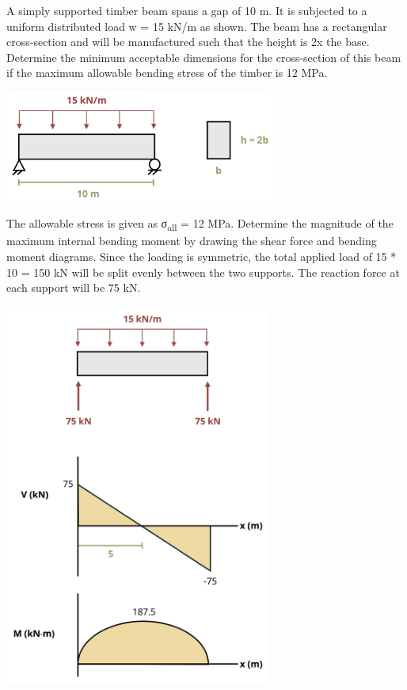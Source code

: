\documentclass[
  letterpaper,
  DIV=11,
  numbers=noendperiod]{scrreprt}
\begin{document}
\begin{tcolorbox}[enhanced jigsaw, colbacktitle=quarto-callout-note-color!10!white, title={Example 9.4: Design of rectangular cross-section}, coltitle=black, leftrule=.75mm, rightrule=.15mm, opacityback=0, breakable, colframe=quarto-callout-note-color-frame, left=2mm, arc=.35mm, colback=white, bottomrule=.15mm, bottomtitle=1mm, toptitle=1mm, titlerule=0mm, opacitybacktitle=0.6, toprule=.15mm]

A simply supported timber beam spans a gap of 10 m. It is subjected to a
uniform distributed load w = 15 kN/m as shown. The beam has a
rectangular cross-section and will be manufactured such that the height
is 2x the base. Determine the minimum acceptable dimensions for the
cross-section of this beam if the maximum allowable bending stress of
the timber is 12 MPa.

\begin{center}
\includegraphics[width=3.48958in,height=\textheight]{images/CH9 PNGs/Example 9.4 part 1.png}
\end{center}

The allowable stress is given as σ\textsubscript{all} = 12 MPa.
Determine the magnitude of the maximum internal bending moment by
drawing the shear force and bending moment diagrams. Since the loading
is symmetric, the total applied load of 15 * 10 = 150 kN will be split
evenly between the two supports. The reaction force at each support will
be 75 kN.

\begin{center}
\includegraphics[width=3.45833in,height=\textheight]{images/CH9 PNGs/Example 9.4 part 2.png}
\end{center}


\end{tcolorbox}
\end{document}
